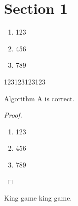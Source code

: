 \documentclass[standalone]{beamer}
\begin{document}
\section{Section 1}

\begin{frame}{}
  \begin{enumerate}
    \item 123
    \item 456
    \item 789
  \end{enumerate}
\end{frame}

\begin{frame}{}
  
\begin{property}
  123123123123
\end{property}

\begin{theorem}
  Algorithm A is correct.
\end{theorem}

\end{frame}

\begin{frame}{}
  \begin{proof}
    \begin{enumerate}
      \item 123
      \item 456
      \item 789
    \end{enumerate}
  \end{proof}
\end{frame}

\begin{frame}{}

  \begin{problem}
    King game king game.
  \end{problem}

\end{frame}
\end{document}
